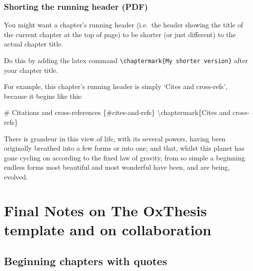 \documentclass[a4paper, twoside]{templates/ociamthesis}
\newenvironment{Shaded}{\begin{snugshade}}{\end{snugshade}}
\newcommand{\FunctionTok}[1]{\textcolor[rgb]{0.00,0.00,0.00}{#1}}
\newcommand{\NormalTok}[1]{#1}
\renewenvironment{Shaded}
{
  \vspace{4pt}%
  \begin{snugshade}%
}{%
  \end{snugshade}%
  \vspace{4pt}%
}
\begin{document}
\hypertarget{shorting-the-running-header-pdf}{%
\subsection{Shorting the running header (PDF)}\label{shorting-the-running-header-pdf}}

You might want a chapter's running header (i.e.~the header showing the title of the current chapter at the top of page) to be shorter (or just different) to the actual chapter title.

Do this by adding the latex command \texttt{\textbackslash{}chaptermark\{My\ shorter\ version\}} after your chapter title.

For example, this chapter's running header is simply `Cites and cross-refs', because it begins like this:

\begin{Shaded}
\begin{Highlighting}[]
\FunctionTok{# Citations and cross-references \{#cites-and-refs\}}
\NormalTok{\textbackslash{}chaptermark\{Cites and cross-refs\}}
\end{Highlighting}
\end{Shaded}

\begin{savequote}
There is grandeur in this view of life, with its several powers, having
been originally breathed into a few forms or into one; and that, whilst
this planet has gone cycling on according to the fixed law of gravity,
from so simple a beginning endless forms most beautiful and most
wonderful have been, and are being, evolved.
\end{savequote}



\hypertarget{final-notes-on-the-oxthesis-template-and-on-collaboration}{%
\chapter{Final Notes on The OxThesis template and on collaboration}\label{final-notes-on-the-oxthesis-template-and-on-collaboration}}

\minitoc 

\hypertarget{beginning-chapters-with-quotes}{%
\section{Beginning chapters with quotes}\label{beginning-chapters-with-quotes}}
\end{document}
